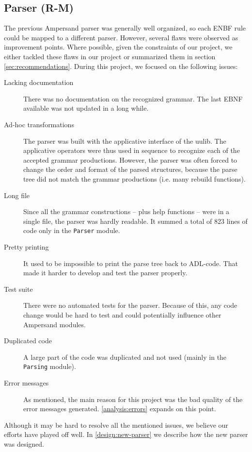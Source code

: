 
\subsection{Parser (R-M)}
\label{analysis:parser}
The previous Ampersand parser was generally well organized, so each ENBF rule could be mapped to a different parser.
However, several flaws were observed as improvement points.
Where possible, given the constraints of our project, we either tackled these flaws in our project or summarized them in section \autoref{sec:recommendations}.
During this project, we focused on the following issues:
\begin{description}
  \item[Lacking documentation]
    There was no documentation on the recognized grammar.
    The last EBNF available was not updated in a long while.
  
  \item[Ad-hoc transformations]
    The parser was built with the applicative interface of the uulib.
    The applicative operators were thus used in sequence to recognize each of the accepted grammar productions.
    However, the parser was often forced to change the order and format of the parsed structures, because the parse tree did not match the grammar productions (i.e. many rebuild functions).
    
  \item[Long file]
    Since all the grammar constructions -- plus help functions -- were in a single file, the parser was hardly readable.
    It summed a total of 823 lines of code only in the \texttt{Parser} module.
  
  \item[Pretty printing]
    It used to be impossible to print the parse tree back to ADL-code.
    That made it harder to develop and test the parser properly.
  
  \item[Test suite]
    There were no automated tests for the parser.
    Because of this, any code change would be hard to test and could potentially influence other Ampersand modules.
  
  \item[Duplicated code]
    A large part of the code was duplicated and not used (mainly in the \texttt{Parsing} module).
  
  \item[Error messages]
    As mentioned, the main reason for this project was the bad quality of the error messages generated.
    \autoref{analysis:errors} expands on this point.
\end{description}
%
Although it may be hard to resolve all the mentioned issues, we believe our efforts have played off well.
In \autoref{design:new-parser} we describe how the new parser was designed.

